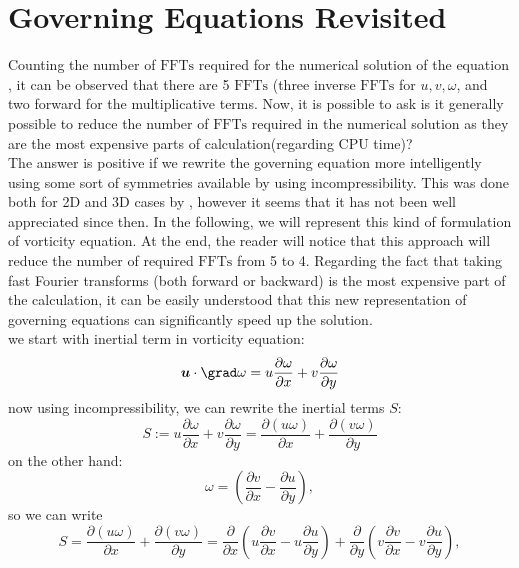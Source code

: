 \documentclass[12pt]{article}
\def\u{\bm{u}}
\begin{document}
\section{Governing Equations Revisited}
Counting the number of $\text{FFTs}$ required for the numerical solution of the equation , it can be observed that there are 5 $\text{FFTs}$ (three inverse $\text{FFTs}$ for $u,v,\omega$, and two forward for the multiplicative terms. Now, it is possible to ask is it generally possible to reduce the number of $\text{FFTs}$ required in the numerical solution as they are the most expensive parts of calculation(regarding CPU time)?\\
The answer is positive if we rewrite the governing equation more
intelligently using some sort of symmetries available by using
incompressibility. This was done both for 2D and 3D cases by
, however it seems that it has not been well appreciated since then. In the following, we will represent this kind of formulation of
vorticity equation. At the end, the reader will notice that this approach
will reduce the number of required $\text{FFTs}$ from 5 to 4. Regarding the
fact that taking fast Fourier transforms (both forward or backward) is the most expensive part of the calculation, it can be easily understood that this new representation of governing equations can significantly speed up the solution. \\
we start with inertial term in vorticity equation:
\begin{equation}\label{Eq-16}
\u\cdot\grad\omega=u\dfrac{\partial \omega}{\partial x}+v\dfrac{\partial \omega}{\partial y}
\end{equation}
now using incompressibility, we can rewrite the inertial terms $S$:
\begin{equation}\label{Eq-17}
S :=u\dfrac{\partial \omega}{\partial x}+v\dfrac{\partial \omega}{\partial y}=\dfrac{\partial (u\omega)}{\partial x}+\dfrac{\partial (v\omega)}{\partial y}
\end{equation}
on the other hand:
\begin{equation}\label{Eq-18}
\omega=\left(\dfrac{\partial v}{\partial x}-\dfrac{\partial u}{\partial y}\right),
\end{equation}
so we can write
\begin{equation}\label{Eq-19}
S =\dfrac{\partial (u\omega)}{\partial x}+\dfrac{\partial (v\omega)}{\partial y}=\dfrac{\partial}{\partial x} \left(u\dfrac{\partial v}{\partial x}-u\dfrac{\partial u}{\partial y}\right)+\dfrac{\partial}{\partial y} \left(v\dfrac{\partial v}{\partial x}-v\dfrac{\partial u}{\partial y}\right),
\end{equation}
\end{document}
